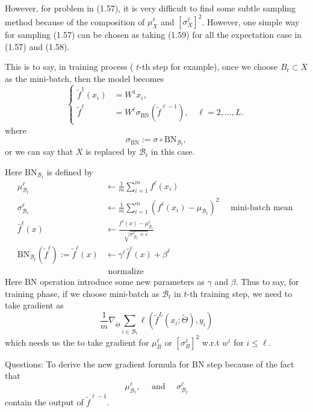 \documentclass[10pt]{article}
\begin{document}
However, for problem in (1.57), it is very difficult to find some subtle sampling method because of the composition of $\mu_{X}^{\ell}$ and $\left[\sigma_{X}^{\ell}\right]^{2}$. However, one simple way for sampling (1.57) can be chosen as taking (1.59) for all the expectation case in (1.57) and (1.58).

This is to say, in training process ( $t$-th step for example), once we choose $B_{t} \subset X$ as the mini-batch, then the model becomes
$$
\begin{cases}\tilde{f}^{1}\left(x_{i}\right) & =W^{1} x_{i}, \\ \tilde{f}^{\ell} & =W^{\ell} \sigma_{\mathrm{BN}}\left(\tilde{f}^{\ell-1}\right), \quad \ell=2, \ldots, L .\end{cases}
$$
where
$$
\sigma_{\mathrm{BN}}:=\sigma \circ \mathrm{BN}_{\mathcal{B}_{t}},
$$
or we can say that $X$ is replaced by $\mathcal{B}_{t}$ in this case.

Here $\mathrm{BN}_{\mathcal{B}_{t}}$ is defined by
$$
\begin{array}{cr}
\mu_{\mathcal{B}_{t}}^{\ell} & \leftarrow \frac{1}{m} \sum_{i=1}^{m} f^{\ell}\left(x_{i}\right) \\
\sigma_{\mathcal{B}_{t}}^{\ell} & \leftarrow \frac{1}{m} \sum_{i=1}^{m}\left(f^{\ell}\left(x_{i}\right)-\mu_{\mathcal{B}_{t}}\right)^{2} \quad \text { mini-batch mean } \\
\hat{f}^{\ell}(x) & \leftarrow \frac{f^{\ell}(x)-\mu_{\mathcal{B}_{t}}^{\ell}}{\sqrt{\sigma_{\mathcal{B}_{t}}^{\ell}+\epsilon}} \\
\mathrm{BN}_{\mathcal{B}_{t}}\left(\tilde{f}^{\ell}\right):=\tilde{f}^{\ell}(x) & \leftarrow \gamma^{\ell} \hat{f}^{\ell}(x)+\beta^{\ell} \\
& \text { normalize }
\end{array}
$$
Here BN operation introduce some new parameters as $\gamma$ and $\beta$. Thus to say, for training phase, if we choose mini-batch as $\mathcal{B}_{t}$ in $t$-th training step, we need to take gradient as
$$
\frac{1}{m} \nabla_{\tilde{\Theta}} \sum_{i \in \mathcal{B}_{t}} \ell\left(\tilde{f}^{L}\left(x_{i} ; \tilde{\Theta}\right), y_{i}\right)
$$
which needs us the to take gradient for $\mu_{B}^{\ell}$ or $\left[\sigma_{B}^{\ell}\right]^{2}$ w.r.t $w^{i}$ for $i \leq \ell$.

Questions: To derive the new gradient formula for BN step because of the fact that
$$
\mu_{\mathcal{B}_{t}}^{\ell}, \quad \text { and } \quad \sigma_{\mathcal{B}_{t}}^{\ell}
$$
contain the output of $\tilde{f}^{\ell-1}$.
\end{document}
